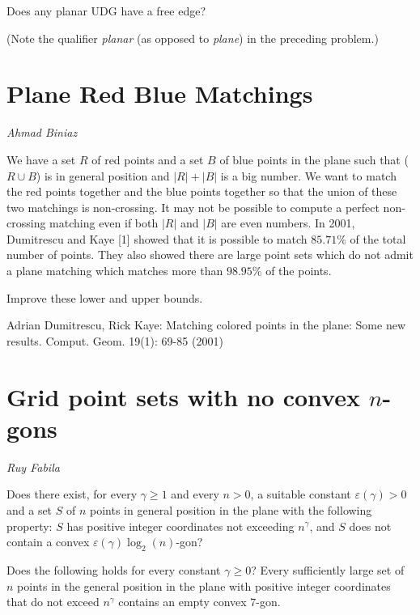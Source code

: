 \documentclass{patmorin}
\begin{document}
\begin{op}
  Does any planar UDG have a free edge?
\end{op}

\noindent (Note the qualifier \emph{planar} (as opposed to \emph{plane}) in the
preceding problem.)


\section{Plane Red Blue Matchings}

\noindent\emph{Ahmad Biniaz}

We have a set $R$ of red points and a set $B$ of blue points in the plane such that ($R\cup B$) is in general position and $|R|+|B|$ is a big number. We want to match the red points together and the blue points together so that the union of these two matchings is non-crossing. It may not be possible to compute a perfect non-crossing matching even if both $|R|$ and $|B|$ are even numbers. In 2001, Dumitrescu and Kaye [1] showed that it is possible to match $85.71\%$ of the total number of points. They also showed there are large point sets which do not admit a plane matching which matches more than $98.95\%$ of the points. 

\begin{op}
  Improve these lower and upper bounds.
\end{op}

\noindent
Adrian Dumitrescu, Rick Kaye: Matching colored points in the plane: Some new results. Comput. Geom. 19(1): 69-85 (2001)

\section{Grid point sets with no convex $n$-gons}

\noindent\emph{Ruy Fabila}

\begin{op}
  Does there exist, for every $\gamma \ge 1$ and every $n >0$, a suitable constant $\varepsilon(\gamma)>0$ and a set $S$
  of $n$ points in general position in the plane
  with the following property:
 $S$ has positive integer coordinates not exceeding $n^\gamma$, and $S$ does not contain a convex $\varepsilon(\gamma)\log_2(n)$-gon?
\end{op}

\begin{op}\label{prob:int_empty}
 Does the following holds for every constant $\gamma \ge 0$? 
 Every sufficiently large set of $n$ points in the general position in the plane with positive integer coordinates that do not exceed
 $n^{\gamma}$ contains an empty convex $7$-gon.
\end{op}
\end{document}
